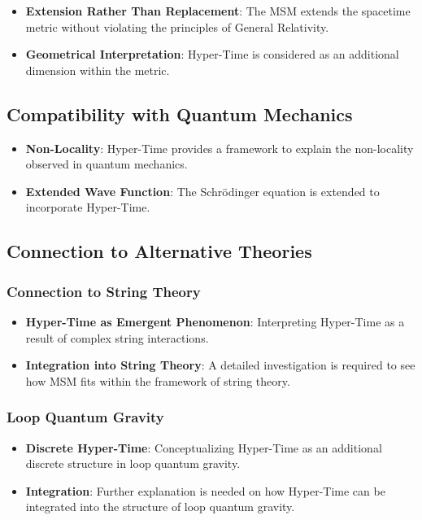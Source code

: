 \documentclass[11pt,a4paper]{article}
\begin{document}
\begin{itemize}
    \item \textbf{Extension Rather Than Replacement}: The MSM extends the spacetime metric without violating the principles of General Relativity.
    \item \textbf{Geometrical Interpretation}: Hyper-Time is considered as an additional dimension within the metric.
\end{itemize}

\subsection{Compatibility with Quantum Mechanics}

\begin{itemize}
    \item \textbf{Non-Locality}: Hyper-Time provides a framework to explain the non-locality observed in quantum mechanics.
    \item \textbf{Extended Wave Function}: The Schrödinger equation is extended to incorporate Hyper-Time.
\end{itemize}

\subsection{Connection to Alternative Theories}

\subsubsection{Connection to String Theory}

\begin{itemize}
    \item \textbf{Hyper-Time as Emergent Phenomenon}: Interpreting Hyper-Time as a result of complex string interactions.
    \item \textbf{Integration into String Theory}: A detailed investigation is required to see how MSM fits within the framework of string theory.
\end{itemize}

\subsubsection{Loop Quantum Gravity}

\begin{itemize}
    \item \textbf{Discrete Hyper-Time}: Conceptualizing Hyper-Time as an additional discrete structure in loop quantum gravity.
    \item \textbf{Integration}: Further explanation is needed on how Hyper-Time can be integrated into the structure of loop quantum gravity.
\end{itemize}
\end{document}
